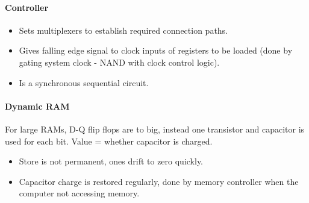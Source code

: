 \documentclass[twocolumn,english]{article}
\begin{document}
\paragraph{Controller}
\begin{itemize}
\item Sets multiplexers to establish required connection paths.
\item Gives falling edge signal to clock inputs of registers to be loaded
(done by gating system clock - NAND with clock control logic).
\item Is a synchronous sequential circuit.
\end{itemize}

\paragraph{Dynamic RAM}

For large RAMs, D-Q flip flops are to big, instead one transistor
and capacitor is used for each bit. Value = whether capacitor is charged.
\begin{itemize}
\item Store is not permanent, ones drift to zero quickly.
\item Capacitor charge is restored regularly, done by memory controller
when the computer not accessing memory.\end{itemize}
\end{document}
